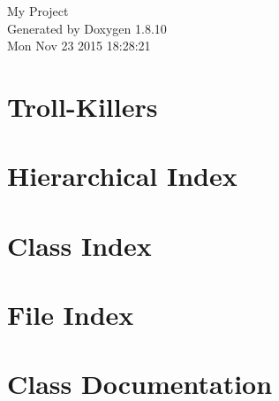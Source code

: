 \documentclass[twoside]{book}
\newcommand{\+}{\discretionary{\mbox{\scriptsize$\hookleftarrow$}}{}{}}
\newcommand{\clearemptydoublepage}{%
  \newpage{\pagestyle{empty}\cleardoublepage}%
}
\begin{document}
\hypersetup{pageanchor=false,
             bookmarks=true,
             bookmarksnumbered=true,
             pdfencoding=unicode
            }
\begin{titlepage}
\vspace*{7cm}
\begin{center}%
{\Large My Project }\\
\vspace*{1cm}
{\large Generated by Doxygen 1.8.10}\\
\vspace*{0.5cm}
{\small Mon Nov 23 2015 18:28:21}\\
\end{center}
\end{titlepage}
\clearemptydoublepage
\tableofcontents
\clearemptydoublepage
{}
\hypersetup{pageanchor=true}

\chapter{Troll-\/\+Killers}
\label{md__home_clemente_projects__troll-_killers__r_e_a_d_m_e}
\hypertarget{md__home_clemente_projects__troll-_killers__r_e_a_d_m_e}{}

\chapter{Hierarchical Index}

\chapter{Class Index}

\chapter{File Index}

\chapter{Class Documentation}

























\end{document}

